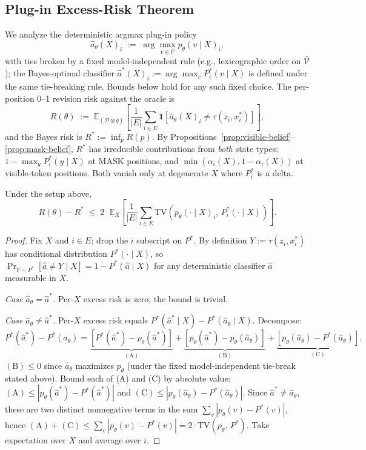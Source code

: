 \documentclass{llmxive}
\providecommand{\xstar}{x^{\ast}}
\providecommand{\TV}[2]{\mathrm{TV}\!\left(#1,\,#2\right)}
\begin{document}
\subsection{Plug-in Excess-Risk Theorem}
\label{app:plugin-excess-risk}

We analyze the deterministic argmax plug-in policy
\[
\hat{a}_\theta(X)_i \;:=\; \arg\max_{v \in \bar{\mathcal{V}}} p_\theta(v \mid X)_i,
\]
with ties broken by a fixed model-independent rule (e.g., lexicographic order on $\bar{\mathcal{V}}$); the Bayes-optimal classifier $\hat{a}^*(X)_i := \arg\max_v P^*_i(v \mid X)$ is defined under the same tie-breaking rule. Bounds below hold for any such fixed choice. The per-position 0--1 revision risk against the oracle is
\[
R(\theta) \;:=\; \mathbb{E}_{(\mathcal{D} \otimes q)}\!\left[\frac{1}{|E|} \sum_{i \in E} \mathbf{1}\!\left[\hat{a}_\theta(X)_i \neq \tau(z_i, \xstar_i)\right]\right],
\]
and the Bayes risk is $R^* := \inf_p R(p)$. By Propositions~\ref{prop:visible-belief}--\ref{prop:mask-belief}, $R^*$ has irreducible contributions from \emph{both} state types: $1 - \max_y P^*_i(y \mid X)$ at MASK positions, and $\min(\alpha_i(X), 1 - \alpha_i(X))$ at visible-token positions. Both vanish only at degenerate $X$ where $P^*_i$ is a delta.

\begin{theorem}
\label{thm:plugin-excess-risk}
Under the setup above,
\[
R(\theta) - R^{*} \;\leq\; 2 \cdot \mathbb{E}_X\!\left[\frac{1}{|E|} \sum_{i \in E} \TV{p_\theta(\cdot \mid X)_i}{P^*_i(\cdot \mid X)}\right].
\]
\end{theorem}

\begin{proof}
Fix $X$ and $i \in E$; drop the $i$ subscript on $P^*$. By definition $Y := \tau(z_i, \xstar_i)$ has conditional distribution $P^*(\cdot \mid X)$, so $\Pr_{Y \sim P^*}[\hat{a} \neq Y \mid X] = 1 - P^*(\hat{a} \mid X)$ for any deterministic classifier $\hat{a}$ measurable in $X$.

\emph{Case $\hat{a}_\theta = \hat{a}^*$.} Per-$X$ excess risk is zero; the bound is trivial.

\emph{Case $\hat{a}_\theta \neq \hat{a}^*$.} Per-$X$ excess risk equals $P^*(\hat{a}^* \mid X) - P^*(\hat{a}_\theta \mid X)$. Decompose:
\[
P^*(\hat{a}^*) - P^*(\hat{a}_\theta) = \underbrace{[P^*(\hat{a}^*) - p_\theta(\hat{a}^*)]}_{(\mathrm{A})} + \underbrace{[p_\theta(\hat{a}^*) - p_\theta(\hat{a}_\theta)]}_{(\mathrm{B})} + \underbrace{[p_\theta(\hat{a}_\theta) - P^*(\hat{a}_\theta)]}_{(\mathrm{C})}.
\]
$(\mathrm{B}) \leq 0$ since $\hat{a}_\theta$ maximizes $p_\theta$ (under the fixed model-independent tie-break stated above). Bound each of (A) and (C) by absolute value: $(\mathrm{A}) \leq |p_\theta(\hat{a}^*) - P^*(\hat{a}^*)|$ and $(\mathrm{C}) \leq |p_\theta(\hat{a}_\theta) - P^*(\hat{a}_\theta)|$. Since $\hat{a}^* \neq \hat{a}_\theta$, these are two distinct nonnegative terms in the sum $\sum_v |p_\theta(v) - P^*(v)|$, hence $(\mathrm{A}) + (\mathrm{C}) \leq \sum_v |p_\theta(v) - P^*(v)| = 2 \cdot \TV{p_\theta}{P^*}$. Take expectation over $X$ and average over $i$.
\end{proof}
\end{document}
